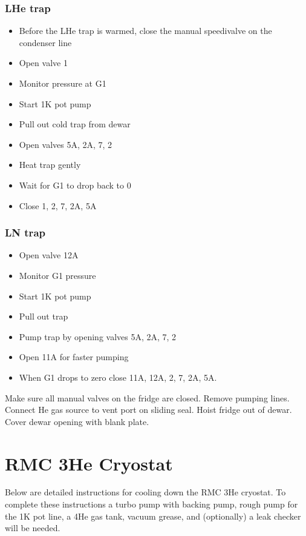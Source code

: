 \subsubsection*{LHe trap}

\begin{itemize}
\item Before the LHe trap is warmed, close the manual speedivalve on the condenser line
\item Open valve 1
\item Monitor pressure at G1
\item Start 1K pot pump
\item Pull out cold trap from dewar
\item Open valves 5A, 2A, 7, 2
\item Heat trap gently
\item Wait for G1 to drop back to 0
\item Close 1, 2, 7, 2A, 5A
\end{itemize}

\subsubsection*{LN trap}

\begin{itemize}
\item Open valve 12A
\item Monitor G1 pressure
\item Start 1K pot pump
\item Pull out trap
\item Pump trap by opening valves 5A, 2A, 7, 2
\item Open 11A for faster pumping
\item When G1 drops to zero close 11A, 12A, 2, 7, 2A, 5A.
\end{itemize}

Make sure all manual valves on the fridge are closed. Remove pumping lines. Connect He gas source to vent port on sliding seal. Hoist fridge out of dewar. Cover dewar opening with blank plate.

\section{RMC 3He Cryostat}
\label{sec:rmc}

Below are detailed instructions for cooling down the RMC 3He cryostat. To complete these instructions a turbo pump with backing pump, rough pump for the 1K pot line, a 4He gas tank, vacuum grease, and (optionally) a leak checker will be needed.

